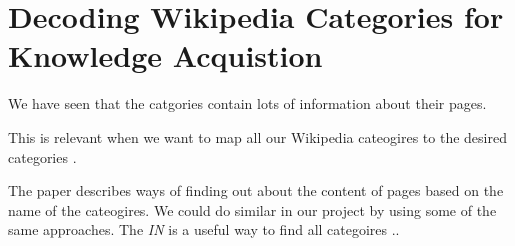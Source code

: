 \section{Decoding Wikipedia Categories for Knowledge Acquistion}

We have seen that the catgories contain lots of information about their pages.

This is relevant when we want to map all our Wikipedia cateogires to the desired categories . 

The paper describes ways of finding out about the content of pages based on the name of the cateogires. We could do similar in our project by using some of the same approaches. The \emph{IN} is a useful way to find all categoires .. 

